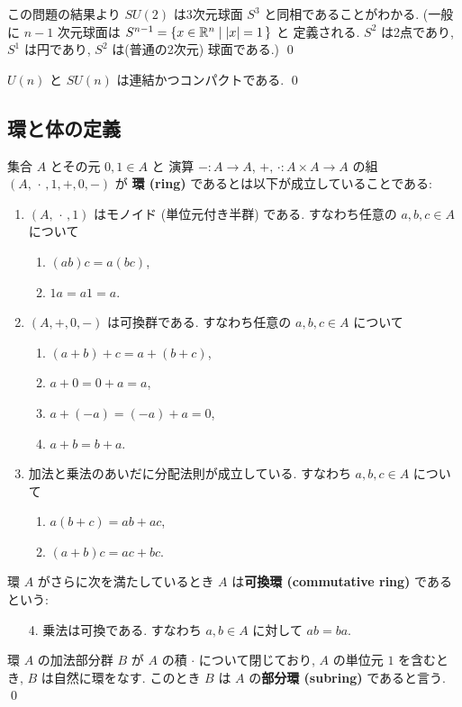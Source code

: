 \documentclass[12pt,twoside]{jarticle}
\begin{document}
\begin{rem}
 この問題の結果より %
 $SU(2)$ は3次元球面 $S^3$ と同相であることがわかる.
 (一般に $n-1$ 次元球面は $S^{n-1} = \{ x \in {\mathbb R}^n \mid |x| = 1 \,\}$ と
 定義される. $S^2$ は2点であり, $S^1$ は円であり, $S^2$ は(普通の2次元)
 球面である.)
 \qed
\end{rem}

\begin{question}[30点]
  $U(n)$ と $SU(n)$ は連結かつコンパクトである. \qed
\end{question}


\subsection{環と体の定義}

\begin{definition}[環, 可換環]
 集合 $A$ とその元 $0,1\in A$ と
 演算 $-:A\to A$, $+,\,\cdot:A\times A\to A$ の組 $(A,\,\cdot\,,1,+,0,-)$ が
 {\bf 環 (ring)} であるとは以下が成立していることである:
 \begin{enumerate}
  \item $(A,\,\cdot\,,1)$ はモノイド (単位元付き半群) である.
  すなわち任意の $a,b,c\in A$ について
  \begin{enumerate}
   \item $(ab)c=a(bc)$,
   \item $1a=a1=a$.
  \end{enumerate}
  \item $(A,+,0,-)$ は可換群である. 
  すなわち任意の $a,b,c\in A$ について
  \begin{enumerate}
   \item $(a+b)+c = a+(b+c)$,
   \item $a+0 = 0+a = a$,
   \item $a + (-a) = (-a) + a = 0$,
   \item $a+b = b+a$.
  \end{enumerate}
  \item 加法と乗法のあいだに分配法則が成立している. 
  すなわち $a,b,c\in A$ について
  \begin{enumerate}
   \item $a(b+c)=ab+ac$,
   \item $(a+b)c=ac+bc$.
  \end{enumerate}
 \end{enumerate}
 環 $A$ がさらに次を満たしているとき %
 $A$ は{\bf 可換環 (commutative ring)} であるという:
 \begin{itemize}
  \item[4.] 乗法は可換である. すなわち $a,b\in A$ に対して $ab=ba$. 
 \end{itemize}
 環 $A$ の加法部分群 $B$ が $A$ の積 $\cdot$ について閉じており, %
 $A$ の単位元 $1$ を含むとき, $B$ は自然に環をなす.
 このとき $B$ は $A$ の{\bf 部分環 (subring)} であると言う.
 \qed
\end{definition}
\end{document}
